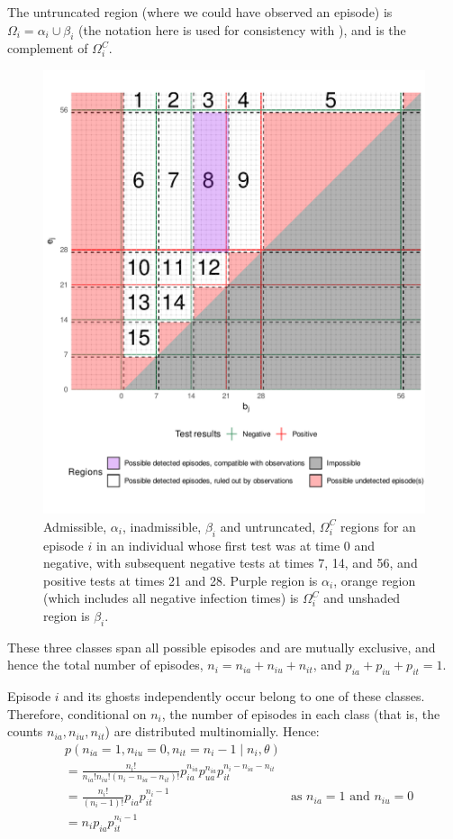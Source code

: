 \documentclass[main.tex]{subfiles}
\begin{document}
The untruncated region (where we could have observed an episode) is
$\Omega_i = \alpha_i \cup \beta_i$ (the notation here is used for
consistency with \textcite{heiseyModelling}), and is the
complement of $\Omega^C_i$.

\begin{figure}
\includegraphics[width=\textwidth]{cis-perfect-testing/regions_diag}
\caption{Admissible, $\alpha_i$, inadmissible, $\beta_i$ and
untruncated, $\Omega_i^C$ regions for an episode $i$ in an
individual whose first test was at time 0 and negative, with subsequent
negative tests at times 7, 14, and 56, and positive tests at times 21
and 28. Purple region is $\alpha_i$, orange region (which includes all
negative infection times) is $\Omega_i^C$ and unshaded region is
$\beta_i$.\label{perf-test:fig:partitionSpace}}
\end{figure}

These three classes span all possible episodes and are mutually
exclusive, and hence the total number of episodes,
$n_i = n_{ia} + n_{iu} + n_{it}$, and
$p_{ia} + p_{iu} + p_{it} = 1$.

Episode $i$ and its ghosts independently occur belong to one of these
classes. Therefore, conditional on $n_i$, the number of episodes in
each class (that is, the counts $n_{ia}, n_{iu}, n_{it}$) are
distributed multinomially. Hence:
\begin{align}
&p(n_{ia} = 1, n_{iu} = 0, n_{it} = n_i - 1 \mid n_i, \theta) \\
&= \frac{n_i!}{n_{ia}! n_{iu}! (n_i- n_{ia} - n_{it})!} p_{ia}^{n_{ia}} p_{ua}^{n_{ia}} p_{it}^{n_i- n_{ia} - n_{it}} \\
&= \frac{n_i!}{(n_i-1)!} p_{ia} p_{it}^{n_i- 1} &\text{as $n_{ia} = 1$ and $n_{iu} = 0$}\\
&= n_i p_{ia} p_{it}^{n_i- 1}
\end{align}
\end{document}
